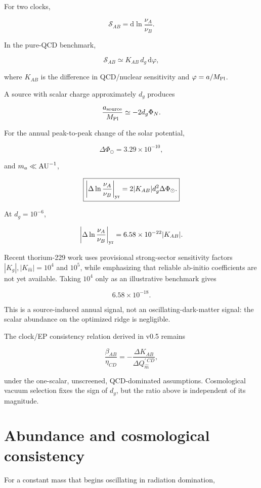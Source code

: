 \documentclass[
  10pt,
]{article}
\begin{document}
For two clocks,

\[
\mathcal S_{AB}=\mathrm d\ln\frac{\nu_A}{\nu_B}.
\]

In the pure-QCD benchmark,

\[
\mathcal S_{AB}
\simeq K_{AB}\,d_g\,\mathrm d\varphi,
\]

where \(K_{AB}\) is the difference in QCD/nuclear sensitivity and
\(\varphi=a/M_{\rm Pl}\).

A source with scalar charge approximately \(d_g\) produces

\[
\frac{a_{\rm source}}{M_{\rm Pl}}
\simeq-2d_g\Phi_N.
\]

For the annual peak-to-peak change of the solar potential,

\[
\Delta\Phi_\odot=3.29\times10^{-10},
\]

and \(m_a\ll {\rm AU}^{-1}\),

\[
\boxed{
\left|\Delta\ln\frac{\nu_A}{\nu_B}\right|_{\rm yr}
=2|K_{AB}|d_g^2\Delta\Phi_\odot.
}
\]

At \(d_g=10^{-6}\),

\[
\left|\Delta\ln\frac{\nu_A}{\nu_B}\right|_{\rm yr}
=6.58\times10^{-22}|K_{AB}|.
\]

Recent thorium-229 work uses provisional strong-sector sensitivity
factors \(|K_g|,|K_{\hat m}|=10^4\) and \(10^5\), while emphasizing that
reliable ab-initio coefficients are not yet available. Taking \(10^4\)
only as an illustrative benchmark gives

\[
6.58\times10^{-18}.
\]

This is a source-induced annual signal, not an oscillating-dark-matter
signal: the scalar abundance on the optimized ridge is negligible.

The clock/EP consistency relation derived in v0.5 remains

\[
\frac{\beta_{AB}}{\eta_{CD}}
=-\frac{\Delta K_{AB}}
{\Delta Q_{\hat m}^{\prime\,CD}},
\]

under the one-scalar, unscreened, QCD-dominated assumptions.
Cosmological vacuum selection fixes the sign of \(d_g\), but the ratio
above is independent of its magnitude.

\section{Abundance and cosmological
consistency}\label{abundance-and-cosmological-consistency}

For a constant mass that begins oscillating in radiation domination,
\end{document}
